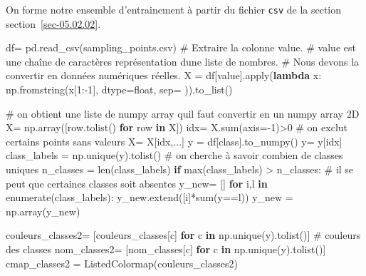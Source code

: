 \documentclass[
  11pt,
  letterpaper,
  open=any,
  twoside=false,
  french]{scrbook}
\newenvironment{Shaded}{\begin{snugshade}}{\end{snugshade}}
\newcommand{\BuiltInTok}[1]{\textcolor[rgb]{0.00,0.23,0.31}{#1}}
\newcommand{\CommentTok}[1]{\textcolor[rgb]{0.37,0.37,0.37}{#1}}
\newcommand{\ControlFlowTok}[1]{\textcolor[rgb]{0.00,0.23,0.31}{\textbf{#1}}}
\newcommand{\DecValTok}[1]{\textcolor[rgb]{0.68,0.00,0.00}{#1}}
\newcommand{\KeywordTok}[1]{\textcolor[rgb]{0.00,0.23,0.31}{\textbf{#1}}}
\newcommand{\NormalTok}[1]{\textcolor[rgb]{0.00,0.23,0.31}{#1}}
\newcommand{\OperatorTok}[1]{\textcolor[rgb]{0.37,0.37,0.37}{#1}}
\newcommand{\StringTok}[1]{\textcolor[rgb]{0.13,0.47,0.30}{#1}}
\begin{document}
On forme notre ensemble d'entrainement à partir du fichier \texttt{csv}
de la section section~\ref{sec-05.02.02}.

\begin{Shaded}
\begin{Highlighting}[]
\NormalTok{df}\OperatorTok{=}\NormalTok{ pd.read\_csv(}\StringTok{\textquotesingle{}sampling\_points.csv\textquotesingle{}}\NormalTok{)}
\CommentTok{\# Extraire la colonne \textquotesingle{}value\textquotesingle{}.}
\CommentTok{\# \textquotesingle{}value\textquotesingle{} est une chaîne de caractères représentation d\textquotesingle{}une liste de nombres.}
\CommentTok{\# Nous devons la convertir en données numériques réelles.}
\NormalTok{X }\OperatorTok{=}\NormalTok{ df[}\StringTok{\textquotesingle{}value\textquotesingle{}}\NormalTok{].}\BuiltInTok{apply}\NormalTok{(}\KeywordTok{lambda}\NormalTok{ x: np.fromstring(x[}\DecValTok{1}\NormalTok{:}\OperatorTok{{-}}\DecValTok{1}\NormalTok{], dtype}\OperatorTok{=}\BuiltInTok{float}\NormalTok{, sep}\OperatorTok{=}\StringTok{\textquotesingle{} \textquotesingle{}}\NormalTok{)).to\_list()}

\CommentTok{\# on obtient une liste de numpy array  qu\textquotesingle{}il faut convertir en un numpy array 2D}
\NormalTok{X}\OperatorTok{=}\NormalTok{ np.array([row.tolist() }\ControlFlowTok{for}\NormalTok{ row }\KeywordTok{in}\NormalTok{ X])}
\NormalTok{idx}\OperatorTok{=}\NormalTok{ X.}\BuiltInTok{sum}\NormalTok{(axis}\OperatorTok{={-}}\DecValTok{1}\NormalTok{)}\OperatorTok{\textgreater{}}\DecValTok{0} \CommentTok{\# on exclut certains points sans valeurs}
\NormalTok{X}\OperatorTok{=}\NormalTok{ X[idx,...]}
\NormalTok{y }\OperatorTok{=}\NormalTok{ df[}\StringTok{\textquotesingle{}class\textquotesingle{}}\NormalTok{].to\_numpy()}
\NormalTok{y}\OperatorTok{=}\NormalTok{ y[idx]}
\NormalTok{class\_labels }\OperatorTok{=}\NormalTok{ np.unique(y).tolist() }\CommentTok{\# on cherche à savoir combien de classes uniques}
\NormalTok{n\_classes }\OperatorTok{=} \BuiltInTok{len}\NormalTok{(class\_labels)}
\ControlFlowTok{if} \BuiltInTok{max}\NormalTok{(class\_labels) }\OperatorTok{\textgreater{}}\NormalTok{ n\_classes: }\CommentTok{\# il se peut que certaines classes soit absentes}
\NormalTok{  y\_new}\OperatorTok{=}\NormalTok{ []}
  \ControlFlowTok{for}\NormalTok{ i,l }\KeywordTok{in} \BuiltInTok{enumerate}\NormalTok{(class\_labels):}
\NormalTok{    y\_new.extend([i]}\OperatorTok{*}\BuiltInTok{sum}\NormalTok{(y}\OperatorTok{==}\NormalTok{l))}
\NormalTok{  y\_new }\OperatorTok{=}\NormalTok{ np.array(y\_new)}

\NormalTok{couleurs\_classes2}\OperatorTok{=}\NormalTok{ [couleurs\_classes[c] }\ControlFlowTok{for}\NormalTok{ c }\KeywordTok{in}\NormalTok{ np.unique(y).tolist()] }\CommentTok{\# couleurs des classes}
\NormalTok{nom\_classes2}\OperatorTok{=}\NormalTok{ [nom\_classes[c] }\ControlFlowTok{for}\NormalTok{ c }\KeywordTok{in}\NormalTok{ np.unique(y).tolist()]}
\NormalTok{cmap\_classes2 }\OperatorTok{=}\NormalTok{ ListedColormap(couleurs\_classes2)}
\end{Highlighting}
\end{Shaded}
\end{document}
